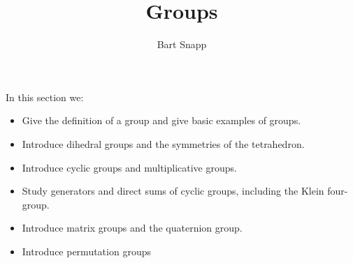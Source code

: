 \documentclass{ximera}
\author{Bart Snapp}
\title{Groups}
\begin{document}
\begin{abstract}
\end{abstract}
\maketitle
In this section we:

\begin{itemize}
\item Give the definition of a group and give basic examples of
  groups.
\item Introduce dihedral groups and the symmetries of the tetrahedron.
\item Introduce cyclic groups and multiplicative groups.
\item Study generators and direct sums of cyclic groups, including the
  Klein four-group.
\item Introduce matrix groups and the quaternion group.
\item Introduce permutation groups
\end{itemize}
\end{document}
